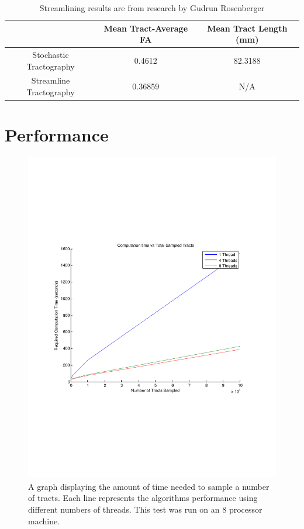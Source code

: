 \begin{table} \label{tab:performance}
  \begin{tabular}{ccc}
    \hline & Mean Tract-Average FA & Mean Tract Length (mm)\\
    \hline Stochastic Tractography & 0.4612 & 82.3188 \\
    Streamline Tractography & 0.36859 & N/A\\
    \hline
  \end{tabular}
  \caption{Streamlining results are from research by Gudrun Rosenberger}
\end{table}

\section{Performance}

\begin{figure} \label{fig:performance}
  \includegraphics[trim = 20mm 70mm 20mm 70mm, clip, width=0.5\linewidth]
	  {timepertracts}
	\caption{A graph displaying the amount of time needed to sample a number of tracts.  Each line represents the algorithms performance using different numbers of threads.  This test was run on an 8 processor machine.}
\end{figure}

